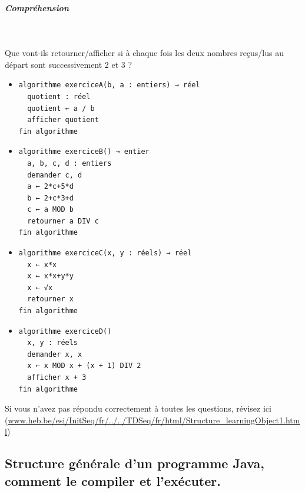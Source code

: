 \documentclass[11pt,a4paper]{article}
\begin{document}
			
		\subparagraph{Compr\'ehension} 
		
                \textcolor{white}{.} \par
            
							  Que vont-ils retourner/afficher si \`a chaque fois les deux nombres re\c cus/lus au d\'epart sont successivement 2 et 3 ?
							
					\begin{itemize}
				
			\item \begin{verbatim}
algorithme exerciceA(b, a : entiers) → réel
  quotient : réel
  quotient ← a / b
  afficher quotient
fin algorithme
				\end{verbatim} \textcolor{gray}{\underline{\hspace*{2em}}} 
			\item \begin{verbatim}
algorithme exerciceB() → entier
  a, b, c, d : entiers
  demander c, d
  a ← 2*c+5*d
  b ← 2+c*3+d
  c ← a MOD b
  retourner a DIV c
fin algorithme
				\end{verbatim} \textcolor{gray}{\underline{\hspace*{1em}}} 
			\item \begin{verbatim}
algorithme exerciceC(x, y : réels) → réel
  x ← x*x 
  x ← x*x+y*y 
  x ← √x
  retourner x
fin algorithme
				\end{verbatim} \textcolor{gray}{\underline{\hspace*{1em}}} 
			\item \begin{verbatim}
algorithme exerciceD()
  x, y : réels
  demander x, x
  x ← x MOD x + (x + 1) DIV 2
  afficher x + 3
fin algorithme
				\end{verbatim} \textcolor{gray}{\underline{\hspace*{1em}}} 
					\end{itemize}
				
            \par
        Si vous n'avez pas r\'epondu correctement \`a toutes les questions, 
        r\'evisez ici (\url{www.heb.be/esi/InitSeq/fr/../../TDSeq/fr/html/Structure\_learningObject1.html})
            \par
        \subsection{Structure g\'en\'erale d'un programme Java, comment le compiler et l'ex\'ecuter.}
			
\end{document}
